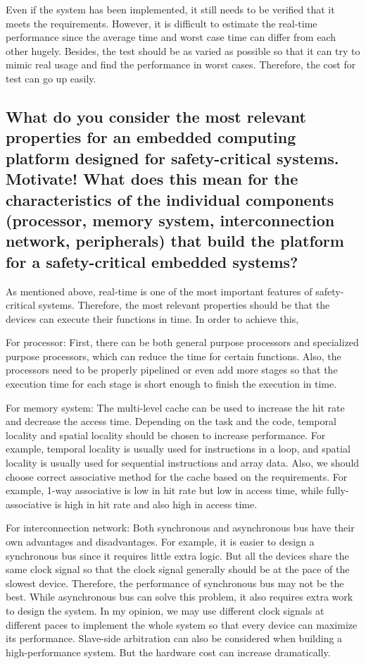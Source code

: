 \documentclass[10pt]{article}
\begin{document}
Even if the system has been implemented, it still needs to be verified that it meets the requirements. However, it is difficult to estimate the real-time performance since the average time and worst case time can differ from each other hugely. Besides, the test should be as varied as possible so that it can try to mimic real usage and find the performance in worst cases. Therefore, the cost for test can go up easily.

\subsection{What do you consider the most relevant properties for an embedded computing platform designed for safety-critical systems. Motivate! What does this mean for the characteristics of the individual components (processor, memory system, interconnection network, peripherals) that build the platform for a safety-critical embedded systems?}

As mentioned above, real-time is one of the most important features of safety-critical systems. Therefore, the most relevant properties should be that the devices can execute their functions in time. In order to achieve this,

For processor: First, there can be both general purpose processors and specialized purpose processors, which can reduce the time for certain functions. Also, the processors need to be properly pipelined or even add more stages so that the execution time for each stage is short enough to finish the execution in time.

For memory system: The multi-level cache can be used to increase the hit rate and decrease the access time. Depending on the task and the code, temporal locality and spatial locality should be chosen to increase performance. For example, temporal locality is usually used for instructions in a loop, and spatial locality is usually used for sequential instructions and array data. Also, we should choose correct associative method for the cache based on the requirements. For example, 1-way associative is low in hit rate but low in access time, while fully-associative is high in hit rate and also high in access time.

For interconnection network: Both synchronous and asynchronous bus have their own advantages and disadvantages. For example, it is easier to design a synchronous bus since it requires little extra logic. But all the devices share the same clock signal so that the clock signal generally should be at the pace of the slowest device. Therefore, the performance of synchronous bus may not be the best. While asynchronous bus can solve this problem, it also requires extra work to design the system. In my opinion, we may use different clock signals at different paces to implement the whole system so that every device can maximize its performance. Slave-side arbitration can also be considered when building a high-performance system. But the hardware cost can increase dramatically.
\end{document}
